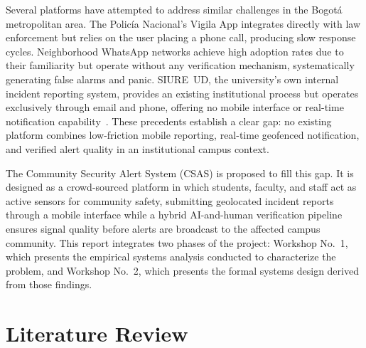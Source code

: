 \documentclass[12pt, oneside]{article}
\begin{document}
Several platforms have attempted to address similar challenges in the Bogot\'a
metropolitan area. The Polic\'ia Nacional's Vigila App integrates directly with law
enforcement but relies on the user placing a phone call, producing slow response cycles.
Neighborhood WhatsApp networks achieve high adoption rates due to their familiarity
but operate without any verification mechanism, systematically generating false alarms
and panic. SIURE~UD, the university's own internal incident reporting system,
provides an existing institutional process but operates exclusively through email and
phone, offering no mobile interface or real-time notification capability~\cite{sierra2026}.
These precedents establish a clear gap: no existing platform combines low-friction
mobile reporting, real-time geofenced notification, and verified alert quality in an
institutional campus context.

The Community Security Alert System (CSAS) is proposed to fill this gap. It is
designed as a crowd-sourced platform in which students, faculty, and staff act as
active sensors for community safety, submitting geolocated incident reports through a
mobile interface while a hybrid AI-and-human verification pipeline ensures signal
quality before alerts are broadcast to the affected campus community. This report
integrates two phases of the project: Workshop No.~1, which presents the empirical
systems analysis conducted to characterize the problem, and Workshop No.~2, which
presents the formal systems design derived from those findings.

\section{Literature Review}
\end{document}
